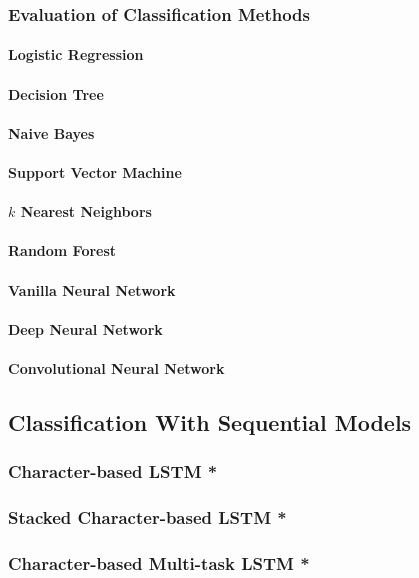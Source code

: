 \subsubsection{Evaluation of Classification Methods}
\label{subs:Evaluation of Classification Methods}

\paragraph{Logistic Regression}
\label{par:Logistic Regression}

\paragraph{Decision Tree}
\label{par:Decision Tree}

\paragraph{Naive Bayes}
\label{par:Naive Bayes}

\paragraph{Support Vector Machine}
\label{par:Support Vector Machine}

\paragraph{$k$ Nearest Neighbors}
\label{par:k Nearest Neighbors}

\paragraph{Random Forest}
\label{par:Random Forest}

\paragraph{Vanilla Neural Network}
\label{par:Vanilla Neural Network}

\paragraph{Deep Neural Network}
\label{par:Deep Neural Network}

\paragraph{Convolutional Neural Network}
\label{par:Convolutional Neural Network}


\subsection{Classification With Sequential Models}
\label{sub:Classification With Sequential Models}

\subsubsection{Character-based LSTM *}

\subsubsection{Stacked Character-based LSTM *}

\subsubsection{Character-based Multi-task LSTM *}
